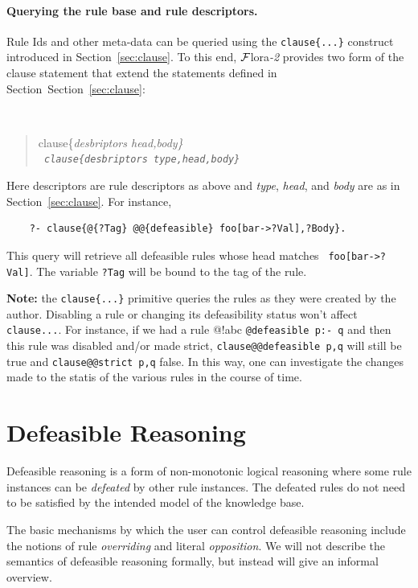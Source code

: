 \documentclass[11pt]{article}
\newcommand{\FLORA}{{\mbox{\sc ${\cal F}${lora}\rm\emph{-2}}}\xspace}
\begin{document}
\paragraph{Querying the rule base and rule descriptors.}
Rule Ids and other meta-data can be queried using the {\tt clause\{...\}}
construct introduced in Section~\ref{sec:clause}. To this end, \FLORA
provides two form of the clause statement that extend the statements
defined in Section~Section~\ref{sec:clause}:
{\tt
\begin{quote}
clause\{\it{desbriptors head,body}\}\\
\tt
clause\{\it{desbriptors type,head,body}\}
\end{quote}
}
Here descriptors are rule descriptors as above and
\emph{type}, \emph{head}, and \emph{body} are as in
Section~\ref{sec:clause}. 
For instance,
\begin{verbatim}
    ?- clause{@{?Tag} @@{defeasible} foo[bar->?Val],?Body}.
\end{verbatim}
This query will retrieve all defeasible rules whose head matches {\tt
  foo[bar->?Val]}. The variable \texttt{?Tag} will be bound to the tag of
the rule. 

\textbf{Note:} the \texttt{clause\{...\}} primitive queries the rules as
they were created by the author. Disabling a rule or changing its
defeasibility status won't affect \texttt{clause{...}}.
For instance, if we had a
rule @!{abc} \texttt{@{defeasible} p:- q}
and then this rule was disabled and/or
made strict, \texttt{clause{@@{defeasible} p,q}}
will still be true and
\texttt{clause{@@{strict} p,q}} 
false. In this way, one can investigate the changes
made to the statis of the various rules in the course of time.   


\section{Defeasible Reasoning}
\label{sec-defeasible}

Defeasible reasoning is a form of non-monotonic logical reasoning where
some rule instances can be \emph{defeated}  by other rule instances. The
defeated rules do not need to be satisfied by the intended model of the
knowledge base.

The basic mechanisms by which the user can control defeasible
reasoning include the notions of rule \emph{overriding} and literal
\emph{opposition}.  We will not describe the semantics of defeasible
reasoning formally, but instead will give an informal overview.
\end{document}
